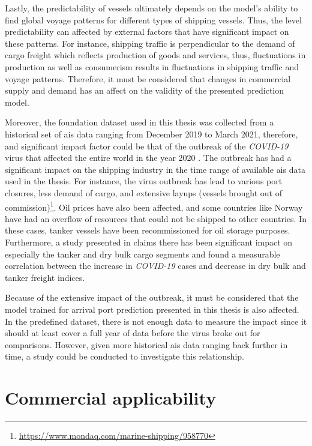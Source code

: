 Lastly, the predictability of vessels ultimately depends on the model's ability to find global voyage patterns for different types of shipping vessels. Thus, the level predictability can affected by external factors that have significant impact on these patterns. For instance, shipping traffic is perpendicular to the demand of cargo freight which reflects production of goods and services, thus, fluctuations in production as well as consumerism results in fluctuations in shipping traffic and voyage patterns. Therefore, it must be considered that changes in commercial supply and demand has an affect on the validity of the presented prediction model.

Moreover, the foundation dataset used in this thesis was collected from a historical set of \acrshort{ais} data ranging from December 2019 to March 2021, therefore, and significant impact factor could be that of the outbreak of the \textit{COVID-19} virus that affected the entire world in the year 2020 \parencite{covid_article}. The outbreak has had a significant impact on the shipping industry in the time range of available \acrshort{ais} data used in the thesis. For instance, the virus outbreak has lead to various port closures, less demand of cargo, and extensive layups (vessels brought out of commission)\footnote{\url{https://www.mondaq.com/marine-shipping/958770}}. Oil prices have also been affected, and some countries like Norway have had an overflow of resources that could not be shipped to other countries. In these cases, tanker vessels have been recommissioned for oil storage purposes. Furthermore, a study presented in \cite{MICHAIL2020100178} claims there has been significant impact on especially the tanker and dry bulk cargo segments and found a measurable correlation between the increase in \textit{COVID-19} cases and decrease in dry bulk and tanker freight indices.

Because of the extensive impact of the outbreak, it must be considered that the model trained for arrival port prediction presented in this thesis is also affected. In the predefined dataset, there is not enough data to measure the impact since it should at least cover a full year of data before the virus broke out for comparisons. However, given more historical \acrshort{ais} data ranging back further in time, a study could be conducted to investigate this relationship.

\section{Commercial applicability}

